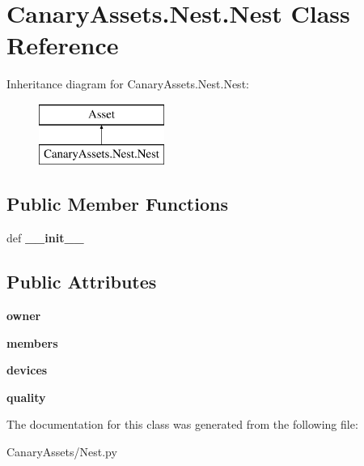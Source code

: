 \hypertarget{class_canary_assets_1_1_nest_1_1_nest}{\section{Canary\-Assets.\-Nest.\-Nest Class Reference}
\label{class_canary_assets_1_1_nest_1_1_nest}
}
Inheritance diagram for Canary\-Assets.\-Nest.\-Nest\-:\begin{figure}[H]
\begin{center}
\leavevmode
\includegraphics[height=2.000000cm]{class_canary_assets_1_1_nest_1_1_nest}
\end{center}
\end{figure}
\subsection*{Public Member Functions}
\begin{DoxyCompactItemize}
\item 
\hypertarget{class_canary_assets_1_1_nest_1_1_nest_a699269ce903225dca30cd976e4023e70}{def {\bfseries \-\_\-\-\_\-init\-\_\-\-\_\-}}\label{class_canary_assets_1_1_nest_1_1_nest_a699269ce903225dca30cd976e4023e70}

\end{DoxyCompactItemize}
\subsection*{Public Attributes}
\begin{DoxyCompactItemize}
\item 
\hypertarget{class_canary_assets_1_1_nest_1_1_nest_a4bb0ecd5e3c3fe14c1b4d0236a4e2e97}{{\bfseries owner}}\label{class_canary_assets_1_1_nest_1_1_nest_a4bb0ecd5e3c3fe14c1b4d0236a4e2e97}

\item 
\hypertarget{class_canary_assets_1_1_nest_1_1_nest_aaf67343a84818206762d2578056b1f2a}{{\bfseries members}}\label{class_canary_assets_1_1_nest_1_1_nest_aaf67343a84818206762d2578056b1f2a}

\item 
\hypertarget{class_canary_assets_1_1_nest_1_1_nest_a9b1ae23c66abc485fb9f9d1402a0f5e2}{{\bfseries devices}}\label{class_canary_assets_1_1_nest_1_1_nest_a9b1ae23c66abc485fb9f9d1402a0f5e2}

\item 
\hypertarget{class_canary_assets_1_1_nest_1_1_nest_a03a0f34c05b34caa402609415dd7e12b}{{\bfseries quality}}\label{class_canary_assets_1_1_nest_1_1_nest_a03a0f34c05b34caa402609415dd7e12b}

\end{DoxyCompactItemize}


The documentation for this class was generated from the following file\-:\begin{DoxyCompactItemize}
\item 
Canary\-Assets/Nest.\-py\end{DoxyCompactItemize}
